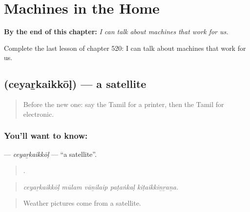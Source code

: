 
\chapter{Machines in the Home}
\label{ch:ta-machines-in-the-home}

\begin{chapteropening}
\textbf{By the end of this chapter:} \emph{I can talk about machines that work for us.}

Complete the last lesson of chapter 520: I can talk about machines that work for us.
\end{chapteropening}

\section[\texorpdfstring{\ta{செயற்கைக்கோள்} (ceyaṟkaikkōḷ)}{செயற்கைக்கோள் (ceyaṟkaikkōḷ)}]{ (ceyaṟkaikkōḷ) — a satellite}

\label{lesson:TA-C520-ceyarkaikkol}



\begin{quote}
Before the new one: say the Tamil for a printer, then the Tamil for electronic.
\end{quote}

\subsection*{You'll want to know: }
\textbf{} — \emph{ceyaṟkaikkōḷ} — \textquotedblleft{}a satellite\textquotedblright{}.

\begin{quote}
    .
\end{quote}

\begin{quote}
\emph{ceyaṟkaikkōḷ mūlam vāṉilaip paṭaṅkaḷ kiṭaikkiṉṟaṉa.}
\end{quote}

\begin{quote}
Weather pictures come from a satellite.
\end{quote}

